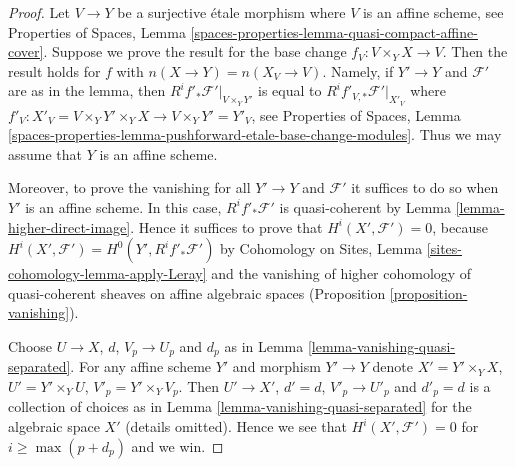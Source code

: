 \documentclass[10pt,a4paper]{amsart}
\theoremstyle{plain}
\theoremstyle{definition}
\theoremstyle{remark}
\numberwithin{equation}{subsection}
\begin{document}
\begin{proof}
Let $V \to Y$ be a surjective \'etale morphism where $V$ is an affine
scheme, see
Properties of Spaces, Lemma
\ref{spaces-properties-lemma-quasi-compact-affine-cover}.
Suppose we prove the result for the base change $f_V : V \times_Y X \to V$.
Then the result holds for $f$ with $n(X \to Y) = n(X_V \to V)$.
Namely, if $Y' \to Y$ and $\mathcal{F}'$ are as in the lemma, then
$R^if'_*\mathcal{F}'|_{V \times_Y Y'}$ is equal to
$R^if'_{V, *}\mathcal{F}'|_{X'_V}$ where
$f'_V : X'_V = V \times_Y Y' \times_Y X \to V \times_Y Y' = Y'_V$, see
Properties of Spaces,
Lemma \ref{spaces-properties-lemma-pushforward-etale-base-change-modules}.
Thus we may assume that $Y$ is an affine scheme.

\medskip\noindent
Moreover, to prove the vanishing for all $Y' \to Y$ and
$\mathcal{F}'$ it suffices to do so when $Y'$ is an affine scheme.
In this case, $R^if'_*\mathcal{F}'$ is quasi-coherent by
Lemma \ref{lemma-higher-direct-image}.
Hence it suffices to prove that $H^i(X', \mathcal{F}') = 0$, because
$H^i(X', \mathcal{F}') = H^0(Y', R^if'_*\mathcal{F}')$ by
Cohomology on Sites, Lemma \ref{sites-cohomology-lemma-apply-Leray}
and the vanishing of higher cohomology of quasi-coherent sheaves
on affine algebraic spaces
(Proposition \ref{proposition-vanishing}).

\medskip\noindent
Choose $U \to X$, $d$, $V_p \to U_p$ and $d_p$ as in
Lemma \ref{lemma-vanishing-quasi-separated}.
For any affine scheme $Y'$ and morphism $Y' \to Y$ denote
$X' = Y' \times_Y X$, $U' = Y' \times_Y U$, $V'_p = Y' \times_Y V_p$.
Then $U' \to X'$, $d' = d$, $V'_p \to U'_p$ and $d'_p = d$
is a collection of choices as in
Lemma \ref{lemma-vanishing-quasi-separated}
for the algebraic space $X'$ (details omitted).
Hence we see that $H^i(X', \mathcal{F}') = 0$ for $i \geq \max(p + d_p)$
and we win.
\end{proof}
\end{document}

